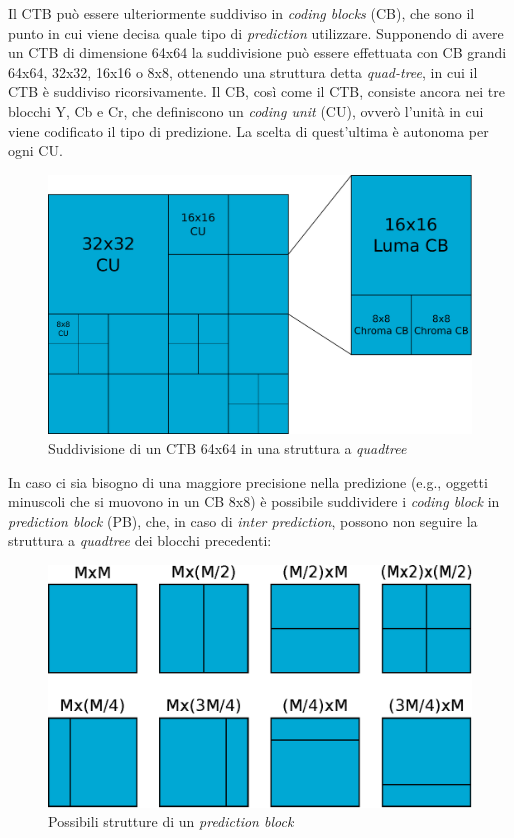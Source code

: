 Il CTB può essere ulteriormente suddiviso in \emph{coding blocks} (CB), che 
sono il punto in cui viene decisa quale tipo di \emph{prediction} utilizzare.
Supponendo di avere un CTB di dimensione 64x64 la suddivisione può essere 
effettuata con CB grandi 64x64, 32x32, 16x16 o 8x8, ottenendo una struttura
detta \emph{quad-tree}, in cui il CTB è suddiviso ricorsivamente. 
Il CB, così come il CTB, consiste ancora nei tre blocchi Y, Cb e 
Cr, che definiscono un \emph{coding unit} (CU), ovverò l'unità in cui viene 
codificato il tipo di predizione. La scelta di quest'ultima è autonoma per ogni 
CU.
\begin{figure}[H]
  \centering
  \includegraphics[scale=0.50]{Figures/CTB-CU-CB}
  \caption[Suddivisione del CTB in CU]{Suddivisione di un CTB 64x64 in una 
struttura a \emph{quadtree}}
\end{figure}
In caso ci sia bisogno di una maggiore precisione nella predizione (e.g., 
oggetti minuscoli che si muovono in un CB 8x8) è possibile suddividere i
\emph{coding block} in \emph{prediction block} (PB), che, in caso di 
\emph{inter prediction}, possono non seguire la struttura a \emph{quadtree} dei
blocchi precedenti:
\begin{figure}[H]
  \centering
  \includegraphics[scale=0.50]{Figures/PB}
  \caption{Possibili strutture di un \emph{prediction block}}
\end{figure}
